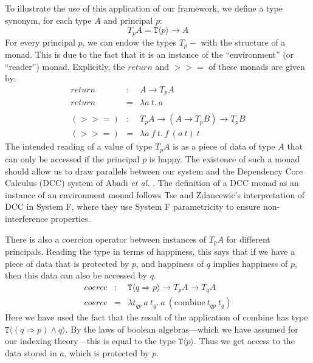\documentclass[natbib,preprint]{sigplanconf}
\newcommand{\tyPrim}[2]{\texttt{#1}\langle #2 \rangle}
\begin{document}
To illustrate the use of this application of our framework, we define
a type synonym, for each type $A$ and principal $p$:
\begin{displaymath}
  T_pA = \tyPrim{T}{p} \to A
\end{displaymath}
For every principal $p$, we can endow the types $T_p-$ with the
structure of a monad. This is due to the fact that it is an instance
of the ``environment'' (or ``reader'') monad. Explicitly, the
$\mathit{return}$ and $>>=$ of these monads are given by:
\begin{eqnarray*}
  \mathit{return} & : & A \to T_pA \\
  \mathit{return} & = & \lambda a\ t.\ a \\
  \\
  (>>=) & : & T_pA \to (A \to T_pB) \to T_pB \\
  (>>=) & = & \lambda a\ f\ t.\ f\ (a\ t)\ t
\end{eqnarray*}
The intended reading of a value of type $T_pA$ is as a piece of data
of type $A$ that can only be accessed if the principal $p$ is
happy. The existence of such a monad should allow us to draw parallels
between our system and the Dependency Core Calculus (DCC) system of
Abadi \emph{et al.} \cite{abadi99core}. The definition of a DCC monad
as an instance of an environment monad follows Tse and Zdancewic's
interpretation of DCC in System F, where they use System F
parametricity to ensure non-interference properties.

There is also a coercion operator between instances of $T_pA$ for
different principals. Reading the type in terms of happiness, this
says that if we have a piece of data that is protected by $p$, and
happiness of $q$ implies happiness of $p$, then this data can also be
accessed by $q$.
\begin{eqnarray*}
  \mathit{coerce} & : & \tyPrim{T}{q \Rightarrow p} \to T_pA \to T_qA \\
  \mathit{coerce} & = & \lambda t_{qp}\ a\ t_q.\ a\ (\mathrm{combine}\ t_{qp}\ t_q)
\end{eqnarray*}
Here we have used the fact that the result of the application of
$\mathrm{combine}$ has type $\tyPrim{T}{(q \Rightarrow p) \land
  q}$. By the laws of boolean algebras---which we have assumed for our
indexing theory---this is equal to the type $\tyPrim{T}{p}$. Thus we
get access to the data stored in $a$, which is protected by $p$.
\end{document}

